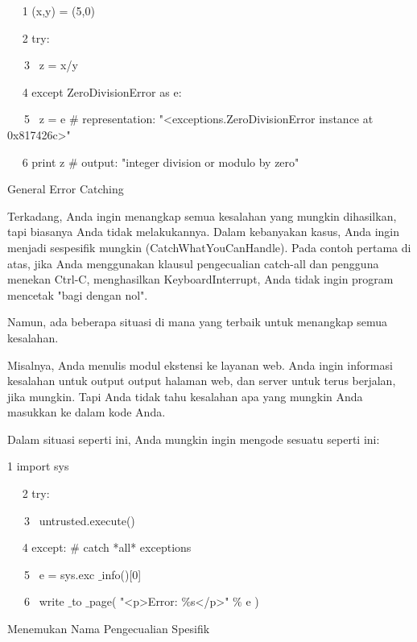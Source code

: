 \vspace{12pt}
\vspace{12pt}
~~ 1 (x,y) = (5,0) \par
~~ 2 try: \par
~~~3~  z = x/y \par
~~ 4 except ZeroDivisionError as e: \par
~~~5~  z = e  $  \#  $ representation: "<exceptions.ZeroDivisionError instance at 0x817426c>" \par
~~ 6 print z  $  \#  $ output: "integer division or modulo by zero" \par
\vspace{12pt}
General Error Catching \par
\vspace{12pt}
Terkadang, Anda ingin menangkap semua kesalahan yang mungkin dihasilkan, tapi biasanya Anda tidak melakukannya. Dalam kebanyakan kasus, Anda ingin menjadi sespesifik mungkin (CatchWhatYouCanHandle). Pada contoh pertama di atas, jika Anda menggunakan klausul pengecualian catch-all dan pengguna menekan Ctrl-C, menghasilkan KeyboardInterrupt, Anda tidak ingin program mencetak "bagi dengan nol". \par
\vspace{12pt}
Namun, ada beberapa situasi di mana yang terbaik untuk menangkap semua kesalahan. \par
\vspace{12pt}
Misalnya, Anda menulis modul ekstensi ke layanan web. Anda ingin informasi kesalahan untuk output output halaman web, dan server untuk terus berjalan, jika mungkin. Tapi Anda tidak tahu kesalahan apa yang mungkin Anda masukkan ke dalam kode Anda. \par
\vspace{12pt}
Dalam situasi seperti ini, Anda mungkin ingin mengode sesuatu seperti ini: \par
\vspace{12pt}
 1 import sys \par
~~ 2 try: \par
~~~3~  untrusted.execute() \par
~~ 4 except:  $  \#  $ catch *all* exceptions \par
~~~5~  e = sys.exc $  \_  $info()[0] \par
~~~6~  write $  \_  $to $  \_  $page( "<p>Error:  $  \%  $s</p>"  $  \%  $ e ) \par
\vspace{12pt}
Menemukan Nama Pengecualian Spesifik \par
